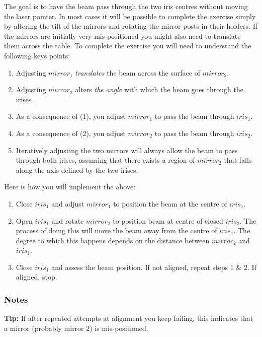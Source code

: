 \documentclass[a4paper]{report}
\begin{document}
The goal is to have the beam pass through the two iris centres without moving the laser pointer. 
In most cases it will be possible to complete the exercise simply by altering the tilt of the mirrors and rotating the mirror posts in their holders. 
If the mirrors are initially very mis-positioned you might also need to translate them across the table. 
To complete the exercise you will need to understand the following keys points:

\begin{enumerate}
\item Adjusting $mirror_1$ \textit{translates} the beam across the surface of $mirror_2$.
\item Adjusting $mirror_2$ alters \textit{the angle} with which the beam goes through the irises. 
\item As a consequence of (1), you adjust $mirror_1$ to pass the beam through $iris_1$.
\item As a consequence of (2), you adjust $mirror_2$ to pass the beam through $iris_2$.
\item Iteratively adjusting the two mirrors will always allow the beam to pass through both irises, assuming that there exists a region of $mirror_2$ that falls along the axis defined by the two irises. 
\end{enumerate}


Here is how you will implement the above:

\begin{enumerate}
\item Close $iris_1$ and adjust $mirror_1$ to position the beam at the centre of $iris_1$.
\item Open $iris_1$ and rotate $mirror_2$ to position beam at centre of closed $iris_2$. 
The process of doing this will move the beam away from the centre of $iris_1$. 
The degree to which this happens depends on the distance between $mirror_2$ and $iris_1$.
\item Close $iris_1$ and assess the beam position. If not aligned, repeat steps 1 \& 2. 
If aligned, stop. 
\end{enumerate}

\subsubsection{Notes}
\textbf{Tip:} If after repeated attempts at alignment you keep failing, this indicates that a mirror (probably mirror 2) is mis-positioned. 
\end{document}
